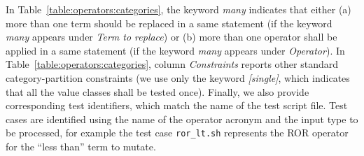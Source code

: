 In Table~\ref{table:operators:categories}, the keyword \emph{many} indicates that either (a) more than one term should be replaced in a same statement (if the keyword \emph{many} appears under \emph{Term to replace}) or (b) more than one operator shall be applied in a same statement (if the keyword \emph{many} appears under \emph{Operator}).
In Table~\ref{table:operators:categories}, column \emph{Constraints} reports other standard category-partition constraints (we use only the keyword \emph{[single]}, which indicates that all the value classes shall be tested once).
Finally, we also provide corresponding test identifiers, which match the name of the test script file. Test cases are identified using the name of the operator acronym and the input type to be processed, for example the test case \texttt{ror\_lt.sh} represents the ROR operator for the ``less than'' term to mutate.






